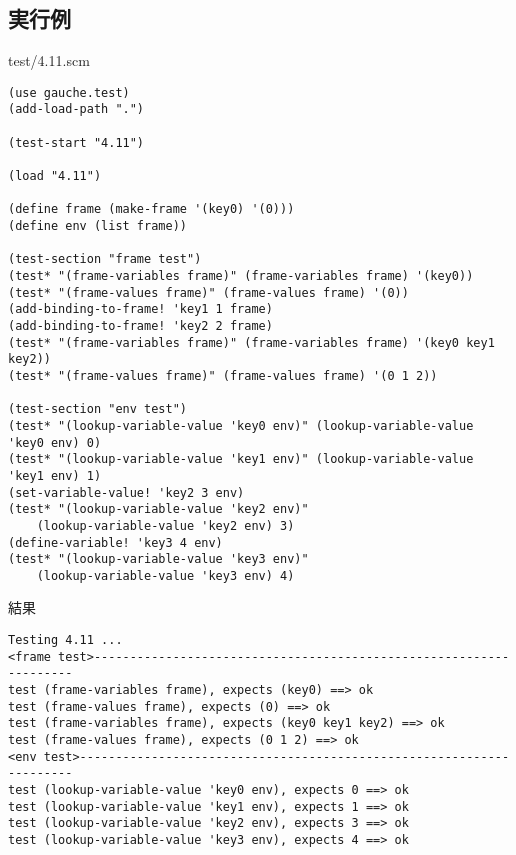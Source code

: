\documentclass[a4paper,12pt]{article}
\begin{document}
\subsection{実行例}
test/4.11.scm\\
{\small
\begin{verbatim}
(use gauche.test)
(add-load-path ".")

(test-start "4.11")

(load "4.11")

(define frame (make-frame '(key0) '(0)))
(define env (list frame))

(test-section "frame test")
(test* "(frame-variables frame)" (frame-variables frame) '(key0))
(test* "(frame-values frame)" (frame-values frame) '(0))
(add-binding-to-frame! 'key1 1 frame)
(add-binding-to-frame! 'key2 2 frame)
(test* "(frame-variables frame)" (frame-variables frame) '(key0 key1 key2))
(test* "(frame-values frame)" (frame-values frame) '(0 1 2))

(test-section "env test")
(test* "(lookup-variable-value 'key0 env)" (lookup-variable-value 'key0 env) 0)
(test* "(lookup-variable-value 'key1 env)" (lookup-variable-value 'key1 env) 1)
(set-variable-value! 'key2 3 env)
(test* "(lookup-variable-value 'key2 env)" 
	(lookup-variable-value 'key2 env) 3)
(define-variable! 'key3 4 env)
(test* "(lookup-variable-value 'key3 env)" 
	(lookup-variable-value 'key3 env) 4)
\end{verbatim}
}

結果\\
{\small
\begin{verbatim}
Testing 4.11 ...                                                 
<frame test>-------------------------------------------------------------------
test (frame-variables frame), expects (key0) ==> ok
test (frame-values frame), expects (0) ==> ok
test (frame-variables frame), expects (key0 key1 key2) ==> ok
test (frame-values frame), expects (0 1 2) ==> ok
<env test>---------------------------------------------------------------------
test (lookup-variable-value 'key0 env), expects 0 ==> ok
test (lookup-variable-value 'key1 env), expects 1 ==> ok
test (lookup-variable-value 'key2 env), expects 3 ==> ok
test (lookup-variable-value 'key3 env), expects 4 ==> ok
\end{verbatim}
}
\end{document}
